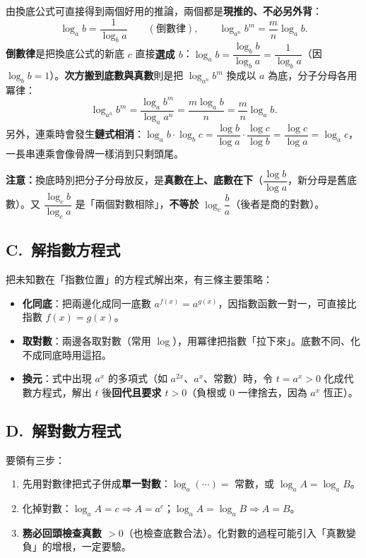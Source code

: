 \documentclass[11pt]{article}
\begin{document}
由換底公式可直接得到兩個好用的推論，兩個都是\textbf{現推的、不必另外背}：
$$\log_a b=\frac{1}{\log_b a}\qquad(\text{倒數律}),\qquad \log_{a^{n}}b^{m}=\frac{m}{n}\log_a b.$$
\textbf{倒數律}是把換底公式的新底 $c$ 直接\textbf{選成 $b$}：$\log_a b=\dfrac{\log_b b}{\log_b a}=\dfrac{1}{\log_b a}$（因 $\log_b b=1$）。\textbf{次方搬到底數與真數}則是把 $\log_{a^{n}}b^{m}$ 換成以 $a$ 為底，分子分母各用冪律：
$$\log_{a^{n}}b^{m}=\frac{\log_a b^{m}}{\log_a a^{n}}=\frac{m\log_a b}{n}=\frac{m}{n}\log_a b.$$
另外，連乘時會發生\textbf{鏈式相消}：$\log_a b\cdot\log_b c=\dfrac{\log b}{\log a}\cdot\dfrac{\log c}{\log b}=\dfrac{\log c}{\log a}=\log_a c$，一長串連乘會像骨牌一樣消到只剩頭尾。

\textbf{注意：}換底時別把分子分母放反，是\textbf{真數在上、底數在下}（$\dfrac{\log b}{\log a}$，新分母是舊底數）。又 $\dfrac{\log_c b}{\log_c a}$ 是「兩個對數相除」，\textbf{不等於} $\log_c\dfrac{b}{a}$（後者是商的對數）。

\subsection*{\sffamily C.\ 解指數方程式}

把未知數在「指數位置」的方程式解出來，有三條主要策略：

\begin{itemize}\setlength{\itemsep}{2pt}
\item \textbf{化同底}：把兩邊化成同一底數 $a^{f(x)}=a^{g(x)}$，因指數函數一對一，可直接比指數 $f(x)=g(x)$。
\item \textbf{取對數}：兩邊各取對數（常用 $\log$），用冪律把指數「拉下來」。底數不同、化不成同底時用這招。
\item \textbf{換元}：式中出現 $a^x$ 的多項式（如 $a^{2x}$、$a^x$、常數）時，令 $t=a^x>0$ 化成代數方程式，解出 $t$ 後\textbf{回代且要求 $t>0$}（負根或 $0$ 一律捨去，因為 $a^x$ 恆正）。
\end{itemize}

\subsection*{\sffamily D.\ 解對數方程式}

要領有三步：
\begin{enumerate}\setlength{\itemsep}{2pt}
\item 先用對數律把式子併成\textbf{單一對數}：$\log_a(\cdots)=$ 常數，或 $\log_a A=\log_a B$。
\item 化掉對數：$\log_a A=c\Rightarrow A=a^{c}$；$\log_a A=\log_a B\Rightarrow A=B$。
\item \textbf{務必回頭檢查真數 $>0$}（也檢查底數合法）。化對數的過程可能引入「真數變負」的增根，一定要驗。
\end{enumerate}
\end{document}
